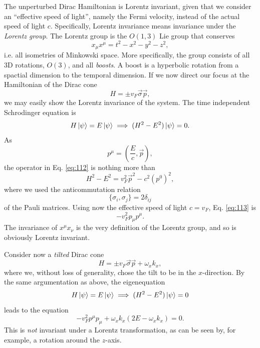 The unperturbed Dirac Hamiltonian is Lorentz invariant, given that we consider an ``effective speed of light'', namely the Fermi velocity, instead of the actual speed of light \( c \).
Specifically, Lorentz invariance means invariance under the \emph{Lorentz group}.
The Lorentz group is the \( O(1,3) \) Lie group that conserves
\[
x_{\mu } x^{\mu } = t^2 - x^2 - y^2 - z^2,
\]
i.e. all isometries of Minkowski space.
More specifically, the group consists of all 3D rotations, \( O(3) \), and all \emph{boosts}.
A boost is a hyperbolic rotation from a spactial dimension to the temporal dimension.
If we now direct our focus at the Hamiltonian of the Dirac cone
\[
H = \pm v_{F} \vec{\sigma} \vec{p},
\]
we may easily show the Lorentz invariance of the system.
The time independent Schrodinger equation is
\begin{equation}
  \label{eq:112}
  H \ket{\psi } = E \ket{\psi } \implies (H^2 - E^2) \ket{\psi } = 0.
\end{equation}
As
\[
p^{\mu } = \left(\frac{E}{c}, \vec{p}\right),
\]
the operator in Eq. \eqref{eq:112} is nothing more than
\begin{equation}
  \label{eq:113}
  H^2-E^2 = v_{F}^2 \vec{p}^2 - c^2 \left(p^0\right)^2 ,
\end{equation}
where we used the anticommutation relation
\[
\{\sigma_{i}, \sigma_{j}\} =  2 \delta _{ij}
\]
of the Pauli matrices.
Using now the effective speed of light \( c=v_F \), Eq. \eqref{eq:113} is
\begin{equation}
  \label{eq:114}
  - v_F^2 p_{\mu } p^{\mu }.
\end{equation}
The invariance of \( x^{\mu} x_{\nu} \) is the very definition of the Lorentz group, and so is obviously Lorentz invariant.

Consider now a \emph{tilted} Dirac cone
\begin{equation}
  \label{eq:115}
  H = \pm v_F \vec{\sigma} \vec{p} + \omega_x k_x,
\end{equation}
where we, without loss of generality, chose the tilt to be in the \( x \)-direction.
By the same argumentation as above, the eigenequation
\[
  H \ket{\psi} = E\ket{\psi} \implies (H^2 - E^2)\ket{\psi} = 0
\]
leads to the equation
\begin{equation}
  \label{eq:116}
  -v_F^2 p^{\mu} p_{\mu} + \omega_{x} k_x (2 E - \omega_x k_x) = 0.
\end{equation}
This is \emph{not} invariant under a Lorentz transformation, as can be seen by, for example, a rotation around the \( z \)-axis.



